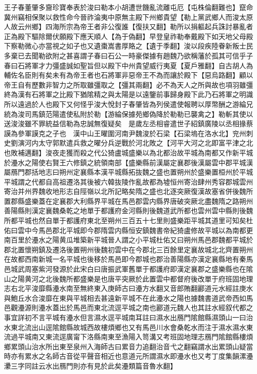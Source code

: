 王子春董肇多齎珍寶奉表於浚曰勒本小胡遭世饑亂流離屯厄【屯株倫翻難也】竄命冀州竊相保聚以救性命今晉祚淪夷中原無主殿下州鄉貴望【勒上黨武鄉人而浚太原人故云州鄉】四海所宗為帝王者非公復誰【復扶又翻】勒所以捐軀起兵誅討暴亂者正為殿下驅除爾伏願殿下應天順人【為于偽翻】早登皇祚勒奉戴殿下如天地父母殿下察勒微心亦當視之如子也又遺棗嵩書厚賂之【遺于季翻】浚以段疾陸眷新叛士民多棄已去聞勒欲附之甚喜謂子春曰石公一時豪傑據有趙魏乃欲稱藩於孤其可信乎子春曰石將軍才力彊盛誠如聖旨但以殿下中州貴望威行夷夏【夏戶雅翻】自古胡人為輔佐名臣則有矣未有為帝王者也石將軍非惡帝王不為而讓於殿下【惡烏路翻】顧以帝王自有歷數非智力之所取雖彊取之【彊其兩翻】必不為天人之所與故也項羽雖彊終為漢有石將軍之比殿下猶隂精之與太陽是以遠鑒前事歸身殿下此乃石將軍之明識所以遠過於人也殿下又何怪乎浚大悅封子春肇皆為列侯遣使報聘以厚幣酬之游綸兄統為浚司馬鎮范陽遣使私附於勒【游綸保據苑鄉偽降於勒勒已襲禽之】勒斬其使以送浚浚雖不罪統益信勒為忠誠無復疑矣　是歲左丞相睿遣世子紹鎮廣陵以丞相掾蔡謨為參軍謨克之子也　漢中山王曜圍河南尹魏浚於石梁【石梁塢在洛水北】兖州刺史劉演河内太守郭默遣兵救之曜分兵逆戰於河北敗之【河平大河之北即富平津之北也敗補邁翻】浚夜走獲而殺之代公猗盧城盛樂以為北都治故平城為南都又作新平城於灅水之陽使右賢王六修鎮之統領南部【盛樂縣前漢屬定襄郡後漢屬雲中郡平城漢屬鴈門郡括地志曰朔州定襄縣本漢平城縣拓抜魏之盛也置朔州於盛樂置桓州於平城平城謂之代都自高祖遷洛其後被六韓抜陵作亂故都為墟恒州寄治肆州秀容郡城雲州寄治并州界魏收地形志自陘嶺以北所記略矣隋之盛也北逐突厥復漢故塞省併後魏所置郡縣盛樂蓋在定襄郡大利縣界平城在馬邑郡雲内縣界唐破突厥北盡魏隋之路朔州善陽縣則漢定襄魏桑乾之地單于都護府金河縣則後魏道武所都也雲州雲中縣則後魏所都平城也然自單于都護府東北至朔州三百五十七里則盛樂距平城其道里可知矣杜佑曰雲中今馬邑郡北平城即今郡隋雲内縣恒安鎮魏書帝紀猗盧修故平城以為南都更南百里於灅水之陽黄瓜堆築新平城晉人謂之小平城杜佑又曰朔州馬邑郡魏都平城於郡北置懷朔鎮及遷洛後置朔州後魏初雲中在今郡北三百餘里定襄故城北北齊置朔州在故都西南新城一名平城也後移於馬邑即今郡城也郡治善陽縣亦漢定襄縣地有秦馬邑城武周塞紫河發源於此宋白曰唐振武軍舊單于都護府即漢定襄郡之盛樂縣也在隂山之陽黄河之北後魏所都盛樂是也唐平突厥於此置雲中都督府後改單于府班固地理志右北平浚靡縣灅水南至無終東入庚師古曰灅方水翻又音郎賄翻酈道元水經註庚水與鮑丘水合浚靡在東與平城相去甚遠新平城不在此灅水之陽也據魏書道武帝西如馬邑觀灅源則灅水蓋出於馬邑而東北流逕平城之南也酈道元魏人也其註水經叙代都之事宜詳初不言平城有灅水但言濕水逕平城南耳註曰濕水出鴈門隂館縣濕頭山一曰治水東北流出山逕隂館縣故城西故樓煩鄉也又有馬邑川水會桑乾水而注于濕水濕水東流過平城南又東流逕廣甯下洛縣南東至漁陽入笥溝又考班固地理志鴈門隂館縣樓煩鄉累頭山治水所出東至泉州入海師古曰累音力追翻治音弋之翻竊謂水出累頭山疑當時亦有累水之名師古音從平聲音相近也意道元所謂濕水即灅水也又考丁度集韻漯灅㶟三字同註云水出鴈門則亦有見於此矣灅類篇音魯水翻】


